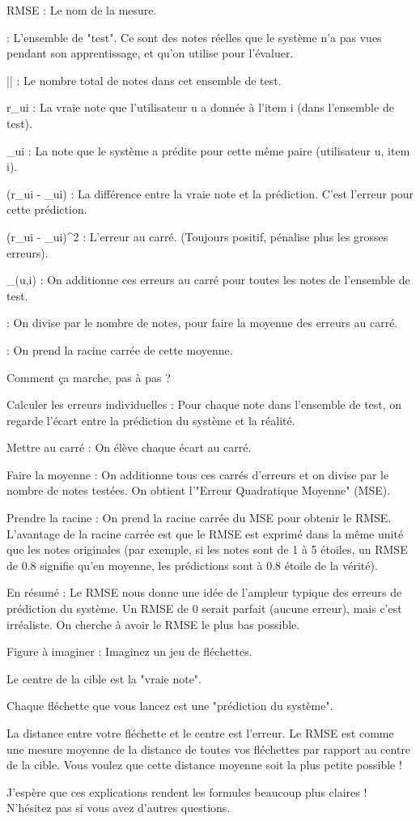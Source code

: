 RMSE : Le nom de la mesure.

 : L'ensemble de "test". Ce sont des notes réelles que le système n'a pas vues pendant son apprentissage, et qu'on utilise pour l'évaluer.

|| : Le nombre total de notes dans cet ensemble de test.

r_{ui} : La vraie note que l'utilisateur u a donnée à l'item i (dans l'ensemble de test).

_{ui} : La note que le système a prédite pour cette même paire (utilisateur u, item i).

(r_{ui} - _{ui}) : La différence entre la vraie note et la prédiction. C'est l'erreur pour cette prédiction.

(r_{ui} - _{ui})^2 : L'erreur au carré. (Toujours positif, pénalise plus les grosses erreurs).

\sum_{(u,i) \in {}} : On additionne ces erreurs au carré pour toutes les notes de l'ensemble de test.

 : On divise par le nombre de notes, pour faire la moyenne des erreurs au carré.

\sqrt{} : On prend la racine carrée de cette moyenne.

Comment ça marche, pas à pas ?

Calculer les erreurs individuelles : Pour chaque note dans l'ensemble de test, on regarde l'écart entre la prédiction du système et la réalité.

Mettre au carré : On élève chaque écart au carré.

Faire la moyenne : On additionne tous ces carrés d'erreurs et on divise par le nombre de notes testées. On obtient l'"Erreur Quadratique Moyenne" (MSE).

Prendre la racine : On prend la racine carrée du MSE pour obtenir le RMSE. L'avantage de la racine carrée est que le RMSE est exprimé dans la même unité que les notes originales (par exemple, si les notes sont de 1 à 5 étoiles, un RMSE de 0.8 signifie qu'en moyenne, les prédictions sont à 0.8 étoile de la vérité).

En résumé : Le RMSE nous donne une idée de l'ampleur typique des erreurs de prédiction du système. Un RMSE de 0 serait parfait (aucune erreur), mais c'est irréaliste. On cherche à avoir le RMSE le plus bas possible.

Figure à imaginer :
Imaginez un jeu de fléchettes.

Le centre de la cible est la "vraie note".

Chaque fléchette que vous lancez est une "prédiction du système".

La distance entre votre fléchette et le centre est l'erreur.
Le RMSE est comme une mesure moyenne de la distance de toutes vos fléchettes par rapport au centre de la cible. Vous voulez que cette distance moyenne soit la plus petite possible !

J'espère que ces explications rendent les formules beaucoup plus claires ! N'hésitez pas si vous avez d'autres questions.

